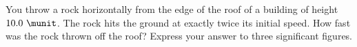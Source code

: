 You throw a rock horizontally from the edge of the roof of a building
of height $10.0\ \munit$. The rock hits the ground at
exactly twice its initial speed. How fast was the rock thrown off the
roof? Express your answer to three significant figures.\answercheck
